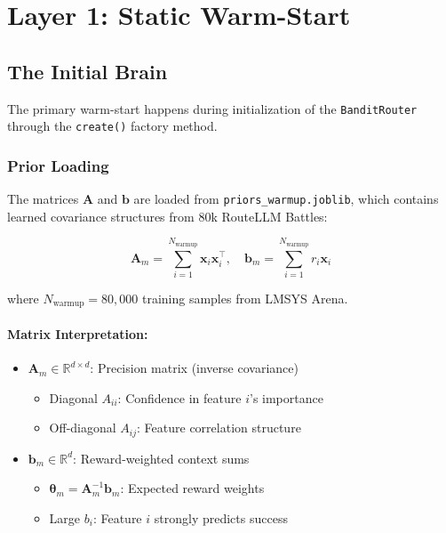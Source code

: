 \documentclass[sigconf]{acmart}
\begin{document}
\section{Layer 1: Static Warm-Start}
\label{sec:static}

\subsection{The Initial Brain}

The primary warm-start happens during initialization of the \texttt{BanditRouter} through the \texttt{create()} factory method.

\subsubsection{Prior Loading}

The matrices $\mathbf{A}$ and $\mathbf{b}$ are loaded from \texttt{priors\_warmup.joblib}, which contains learned covariance structures from 80k RouteLLM Battles:

\begin{equation}
\mathbf{A}_m = \sum_{i=1}^{N_{\text{warmup}}} \mathbf{x}_i \mathbf{x}_i^\top, \quad
\mathbf{b}_m = \sum_{i=1}^{N_{\text{warmup}}} r_i \mathbf{x}_i
\end{equation}

where $N_{\text{warmup}} = 80{,}000$ training samples from LMSYS Arena.

\paragraph{Matrix Interpretation:}
\begin{itemize}
    \item $\mathbf{A}_m \in \mathbb{R}^{d \times d}$: Precision matrix (inverse covariance)
    \begin{itemize}
        \item Diagonal $A_{ii}$: Confidence in feature $i$'s importance
        \item Off-diagonal $A_{ij}$: Feature correlation structure
    \end{itemize}
    \item $\mathbf{b}_m \in \mathbb{R}^d$: Reward-weighted context sums
    \begin{itemize}
        \item $\boldsymbol{\theta}_m = \mathbf{A}_m^{-1}\mathbf{b}_m$: Expected reward weights
        \item Large $b_i$: Feature $i$ strongly predicts success
    \end{itemize}
\end{itemize}
\end{document}
